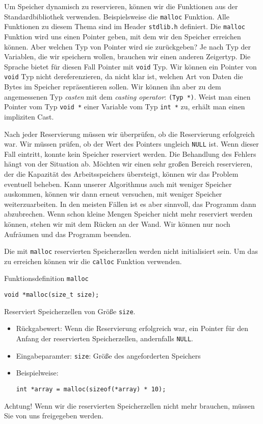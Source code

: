 Um Speicher dynamisch zu reservieren, können wir die Funktionen aus der
Standardbibliothek verwenden. Beispielsweise die \texttt{malloc} Funktion. Alle
Funktionen zu diesem Thema sind im Header \texttt{stdlib.h} definiert. Die
\texttt{malloc} Funktion wird uns einen Pointer geben, mit dem wir den Speicher
erreichen können. Aber welchen Typ von Pointer wird sie zurückgeben? Je nach
Typ der Variablen, die wir speichern wollen, brauchen wir einen anderen
Zeigertyp. Die Sprache bietet für diesen Fall Pointer mit \texttt{void} Typ.
Wir können ein Pointer von \texttt{void} Typ nicht dereferenzieren, da nicht
klar ist, welchen Art von Daten die Bytes im Speicher repräsentieren sollen.
Wir können ihn aber zu dem angemessenen Typ \emph{casten} mit dem \emph{casting
operator}: \texttt{(Typ *)}. Weist man einen Pointer vom Typ \texttt{void *}
einer Variable vom Typ \texttt{int *} zu, erhält man einen impliziten Cast.

Nach jeder Reservierung müssen wir überprüfen, ob die Reservierung erfolgreich
war. Wir müssen prüfen, ob der Wert des Pointers ungleich \texttt{NULL} ist. Wenn dieser Fall eintritt, konnte kein Speicher reserviert werden. Die Behandlung des Fehlers hängt von der Situation ab. Möchten wir einen sehr großen Bereich reservieren, der die Kapazität des Arbeitsspeichers übersteigt, können wir das Problem eventuell beheben. Kann unserer Algorithmus auch mit weniger Speicher auskommen, können wir dann erneut versuchen, mit weniger Speicher weiterzuarbeiten. In den meisten Fällen ist es aber sinnvoll, das Programm dann abzubrechen. Wenn schon kleine Mengen Speicher nicht mehr reserviert werden können, stehen wir mit dem Rücken an der Wand. Wir können nur noch Aufräumen und das Programm beenden.

Die mit \texttt{malloc} reservierten Speicherzellen werden nicht initialisiert
sein. Um das zu erreichen können wir die \texttt{calloc} Funktion verwenden.

\begin{myexampleblock}{Funktionsdefinition \texttt{malloc}}
\begin{lstlisting}
void *malloc(size_t size);
\end{lstlisting}
\vspace{-0.7cm}
Reserviert Speicherzellen von Größe \texttt{size}.
\begin{itemize}
\itemsep0.2pt
\item Rückgabewert: Wenn die Reservierung erfolgreich war, ein Pointer für den Anfang der 
reservierten Speicherzellen, andernfalls \texttt{NULL}.
\item Eingabeparamter: \texttt{size}: Größe des angeforderten Speichers
\item Beispielweise:
\begin{lstlisting}
int *array = malloc(sizeof(*array) * 10);
\end{lstlisting}
\end{itemize}

Achtung! Wenn wir die reservierten Speicherzellen nicht mehr brauchen, müssen
Sie von uns freigegeben werden.
\end{myexampleblock}

